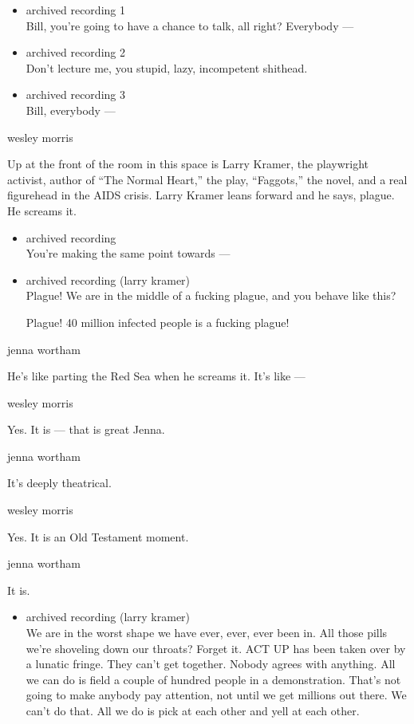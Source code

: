\begin{itemize}
\item
  archived recording 1\\
  Bill, you're going to have a chance to talk, all right? Everybody ---
\item
  archived recording 2\\
  Don't lecture me, you stupid, lazy, incompetent shithead.
\item
  archived recording 3\\
  Bill, everybody ---
\end{itemize}

wesley morris

Up at the front of the room in this space is Larry Kramer, the
playwright activist, author of ``The Normal Heart,'' the play,
``Faggots,'' the novel, and a real figurehead in the AIDS crisis. Larry
Kramer leans forward and he says, plague. He screams it.

\begin{itemize}
\item
  archived recording\\
  You're making the same point towards ---
\item
  archived recording (larry kramer)\\
  Plague! We are in the middle of a fucking plague, and you behave like
  this?

  Plague! 40 million infected people is a fucking plague!
\end{itemize}

jenna wortham

He's like parting the Red Sea when he screams it. It's like ---

wesley morris

Yes. It is --- that is great Jenna.

jenna wortham

It's deeply theatrical.

wesley morris

Yes. It is an Old Testament moment.

jenna wortham

It is.

\begin{itemize}
\tightlist
\item
  archived recording (larry kramer)\\
  We are in the worst shape we have ever, ever, ever been in. All those
  pills we're shoveling down our throats? Forget it. ACT UP has been
  taken over by a lunatic fringe. They can't get together. Nobody agrees
  with anything. All we can do is field a couple of hundred people in a
  demonstration. That's not going to make anybody pay attention, not
  until we get millions out there. We can't do that. All we do is pick
  at each other and yell at each other.
\end{itemize}

